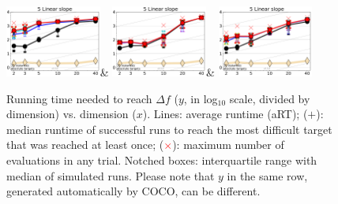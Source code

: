 \documentclass[runningheads]{llncs}
\begin{document}
\begin{figure}[h!tb]
\begin{tabular}
    \includegraphics[width=0.28\textwidth]{GAOnly_f005}&
    \includegraphics[width=0.28\textwidth]{PSOOnly_f005}&
    \includegraphics[width=0.28\textwidth]{GAPSO_f005}\\
    \end{tabular}
    \vspace{-3ex}
     \caption{ Running time needed to reach $\Delta f$ ($y$, in log$_{10}$
       scale, divided by dimension) vs. dimension ($x$). Lines:
 average runtime (aRT); ($+$): median runtime of successful runs to reach
 the most difficult target that was reached at least once;
 (\textcolor{red}{$\times$}): maximum number of evaluations in any trial. Notched boxes:
 interquartile range with median of simulated runs. Please note that
 $y$ in the same row, generated automatically by COCO, can be different.}
\label{fig:bbob}
\end{figure}
\end{document}
